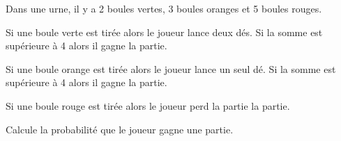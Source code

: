 
\begin{description}
\item Dans une urne, il y a 2 boules vertes, 3 boules oranges et 5 boules rouges. 
\item Si une boule verte est tirée alors le joueur lance deux dés. Si la somme est supérieure à 4 alors il gagne  la partie.
\item Si une boule orange est tirée alors le joueur lance un seul dé. Si la somme est supérieure à 4 alors il gagne la partie.
\item Si une boule rouge est tirée alors le joueur perd la partie la partie.
\end{description}

Calcule la probabilité que le joueur gagne une partie.

